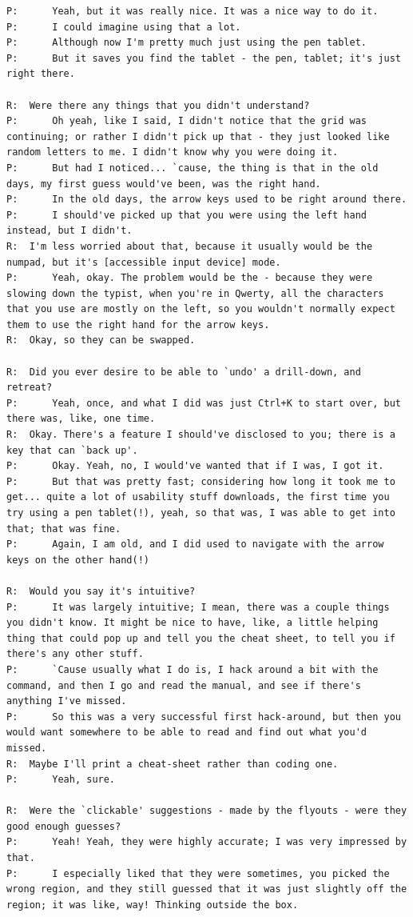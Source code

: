 \documentclass[11pt,openright,a4paper]{report}
\begin{document}
\begin{lstlisting}[caption={Transcript of Usability Study}, label={lst:usabilityTrans}, style=basic, language=custom, flexiblecolumns=true]
P:		Yeah, but it was really nice. It was a nice way to do it.
P:		I could imagine using that a lot.
P:		Although now I'm pretty much just using the pen tablet.
P:		But it saves you find the tablet - the pen, tablet; it's just right there.

R:	Were there any things that you didn't understand?
P:		Oh yeah, like I said, I didn't notice that the grid was continuing; or rather I didn't pick up that - they just looked like random letters to me. I didn't know why you were doing it.
P:		But had I noticed... `cause, the thing is that in the old days, my first guess would've been, was the right hand.
P:		In the old days, the arrow keys used to be right around there.
P:		I should've picked up that you were using the left hand instead, but I didn't.
R:	I'm less worried about that, because it usually would be the numpad, but it's [accessible input device] mode.
P:		Yeah, okay. The problem would be the - because they were slowing down the typist, when you're in Qwerty, all the characters that you use are mostly on the left, so you wouldn't normally expect them to use the right hand for the arrow keys.
R:	Okay, so they can be swapped.

R:	Did you ever desire to be able to `undo' a drill-down, and retreat?
P:		Yeah, once, and what I did was just Ctrl+K to start over, but there was, like, one time.
R:	Okay. There's a feature I should've disclosed to you; there is a key that can `back up'.
P:		Okay. Yeah, no, I would've wanted that if I was, I got it.
P:		But that was pretty fast; considering how long it took me to get... quite a lot of usability stuff downloads, the first time you try using a pen tablet(!), yeah, so that was, I was able to get into that; that was fine.
P:		Again, I am old, and I did used to navigate with the arrow keys on the other hand(!)

R:	Would you say it's intuitive?
P:		It was largely intuitive; I mean, there was a couple things you didn't know. It might be nice to have, like, a little helping thing that could pop up and tell you the cheat sheet, to tell you if there's any other stuff.
P:		`Cause usually what I do is, I hack around a bit with the command, and then I go and read the manual, and see if there's anything I've missed.
P:		So this was a very successful first hack-around, but then you would want somewhere to be able to read and find out what you'd missed.
R:	Maybe I'll print a cheat-sheet rather than coding one.
P:		Yeah, sure.

R:	Were the `clickable' suggestions - made by the flyouts - were they good enough guesses?
P:		Yeah! Yeah, they were highly accurate; I was very impressed by that.
P:		I especially liked that they were sometimes, you picked the wrong region, and they still guessed that it was just slightly off the region; it was like, way! Thinking outside the box.


\end{lstlisting}
\end{document}
